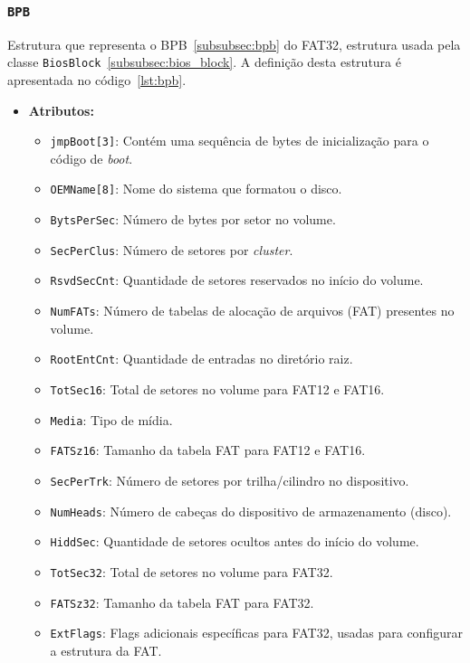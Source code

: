 \documentclass[
    12pt,				%
    oneside,   	        %
    a4paper,			%
    english,			%
    french,				%
    spanish,			%
    brazil,				%
    ]{pacotes/abntex2}
\begin{document}
\subsubsection{\texttt{BPB}}
\label{subsubsec:bpb_code}

Estrutura que representa o BPB~\ref{subsubsec:bpb} do FAT32, estrutura usada pela classe \texttt{BiosBlock}~\ref{subsubsec:bios_block}. A definição desta estrutura é apresentada no código~\ref{lst:bpb}.

\begin{itemize}
    \item \textbf{Atributos:}
        \begin{itemize}
            \item \texttt{jmpBoot[3]}: Contém uma sequência de bytes de inicialização para o código de \textit{boot}.
            \item \texttt{OEMName[8]}: Nome do sistema que formatou o disco.
            \item \texttt{BytsPerSec}: Número de bytes por setor no volume.
            \item \texttt{SecPerClus}: Número de setores por \textit{cluster}.
            \item \texttt{RsvdSecCnt}: Quantidade de setores reservados no início do volume.
            \item \texttt{NumFATs}: Número de tabelas de alocação de arquivos (FAT) presentes no volume.
            \item \texttt{RootEntCnt}: Quantidade de entradas no diretório raiz.
            \item \texttt{TotSec16}: Total de setores no volume para FAT12 e FAT16.
            \item \texttt{Media}: Tipo de mídia.
            \item \texttt{FATSz16}: Tamanho da tabela FAT para FAT12 e FAT16.
            \item \texttt{SecPerTrk}: Número de setores por trilha/cilindro no dispositivo.
            \item \texttt{NumHeads}: Número de cabeças do dispositivo de armazenamento (disco).
            \item \texttt{HiddSec}: Quantidade de setores ocultos antes do início do volume.
            \item \texttt{TotSec32}: Total de setores no volume para FAT32.
            \item \texttt{FATSz32}: Tamanho da tabela FAT para FAT32.
            \item \texttt{ExtFlags}: Flags adicionais específicas para FAT32, usadas para configurar a estrutura da FAT.

\end{itemize}
\end{itemize}
\end{document}
